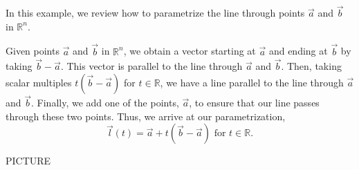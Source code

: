 \documentclass{ximera}
\begin{document}
\begin{example}
In this example, we review how to parametrize the line through points $\vec{a}$ and $\vec{b}$ in $\mathbb{R}^n$.

Given points $\vec{a}$ and $\vec{b}$ in $\mathbb{R}^n$, we obtain a vector starting at $\vec{a}$ and ending at $\vec{b}$ by taking $\vec{b}-\vec{a}$. This vector is parallel to the line through $\vec{a}$ and $\vec{b}$. Then, taking scalar multiples $t(\vec{b} - \vec{a})$ for $t\in\mathbb{R}$, we have a line parallel to the line through $\vec{a}$ and $\vec{b}$. Finally, we add one of the points, $\vec{a}$, to ensure that our line passes through these two points. Thus, we arrive at our parametrization,
\[
\vec{l}(t) = \vec{a} + t(\vec{b}-\vec{a})\textrm{ for }t\in\mathbb{R}.
\]

PICTURE
\end{example}
\end{document}

